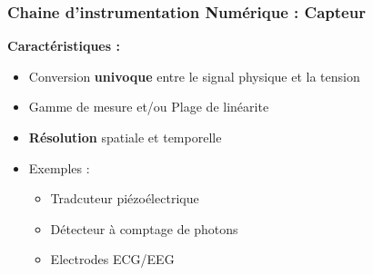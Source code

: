 \documentclass{beamer}
\begin{document}
\begin{frame}
\frametitle{Chaine d'instrumentation Numérique : Capteur}
\begin{center}
\end{center}
\vspace{0.1cm}
\textbf{Caractéristiques :}\\
\vspace{0.1cm}
\begin{itemize}
\item Conversion \textbf{univoque} entre le signal physique et la tension
\vspace{0.1cm}
\item Gamme de mesure et/ou Plage de linéarite
\item \textbf{Résolution} spatiale et temporelle
\item Exemples : 
\begin{itemize}
\item Tradcuteur piézoélectrique
\item Détecteur à comptage de photons
\item Electrodes ECG/EEG
\end{itemize}
\vspace{0.1cm}
\end{itemize}
\end{frame}
\end{document}
